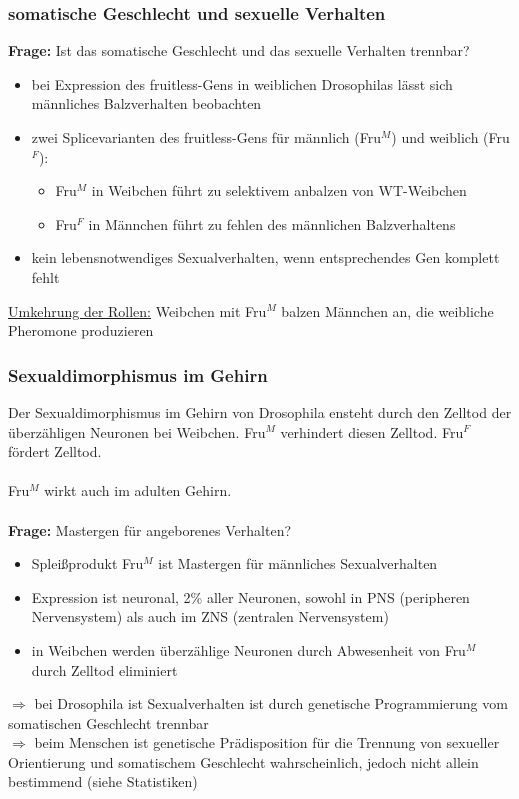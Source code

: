 \subsubsection{somatische Geschlecht und sexuelle Verhalten}
\textbf{Frage:} Ist das somatische Geschlecht und das sexuelle Verhalten trennbar?
\begin{itemize}
	\item bei Expression des fruitless-Gens in weiblichen Drosophilas lässt sich männliches Balzverhalten beobachten
	\item zwei Splicevarianten des fruitless-Gens für männlich (Fru$^M$) und weiblich (Fru$^F$):
	\begin{itemize}
		\item Fru$^M$ in Weibchen führt zu selektivem anbalzen von WT-Weibchen
		\item Fru$^F$ in Männchen führt zu fehlen des männlichen Balzverhaltens
	\end{itemize}
	\item kein lebensnotwendiges Sexualverhalten, wenn entsprechendes Gen komplett fehlt
\end{itemize}

\underline{Umkehrung der Rollen:} Weibchen mit Fru$^M$ balzen Männchen an, die weibliche Pheromone produzieren

\subsubsection{Sexualdimorphismus im Gehirn}
Der Sexualdimorphismus im Gehirn von Drosophila ensteht durch den Zelltod der überzähligen Neuronen bei Weibchen. Fru$^M$ verhindert diesen Zelltod. Fru$^F$ fördert Zelltod.
\\\\
Fru$^M$ wirkt auch im adulten Gehirn.
\\\\
\textbf{Frage:} Mastergen für angeborenes Verhalten?
\begin{itemize}
	\item Spleißprodukt Fru$^M$ ist Mastergen für männliches Sexualverhalten
	\item Expression ist neuronal, 2\% aller Neuronen, sowohl in PNS (peripheren Nervensystem) als auch im ZNS (zentralen Nervensystem)
	\item in Weibchen werden überzählige Neuronen durch Abwesenheit von Fru$^M$ durch Zelltod eliminiert
\end{itemize}

$\Rightarrow$ bei Drosophila ist Sexualverhalten ist durch genetische Programmierung vom somatischen Geschlecht trennbar\\
$\Rightarrow$ beim Menschen ist genetische Prädisposition für die Trennung von sexueller Orientierung und somatischem Geschlecht wahrscheinlich, jedoch nicht allein bestimmend (siehe Statistiken)